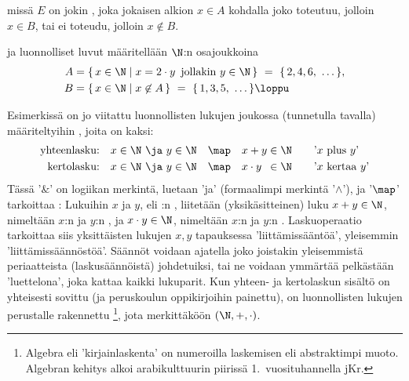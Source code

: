 missä $E$ on jokin , joka jokaisen alkion $x \in A$ kohdalla joko toteutuu, jolloin 
$x \in B$, tai ei toteudu, jolloin $x \not\in B$.
\begin{Exa}  ja  luonnolliset luvut määritellään $\N$:n osajoukkoina
\begin{align*}
A &= \{\,x \in \N \mid x=2\cdot y\,\ \text{jollakin}\ y\in\N\,\}\ =\ \{\,2,4,6,\ \ldots\,\}, \\
B &= \{\,x\in\N \mid x\not\in A\,\}\ =\ \{\,1,3,5,\ \ldots\,\} \loppu
\end{align*}
\end{Exa}
Esimerkissä on jo viitattu luonnollisten lukujen joukossa (tunnetulla tavalla) määriteltyihin 
, joita on kaksi:
\begin{align*}
\text{yhteenlasku:} \quad &x \in \N\ \ja\ y \in \N \quad \map \quad 
                             x + y \in \N \quad \quad \text{'$x$ plus $y$'} \\
\text{kertolasku:}  \quad &x \in \N\ \ja\ y \in \N \quad \map \quad 
                             x \cdot y\ \,\in \N \quad \quad \text{'$x$ kertaa $y$'}
\end{align*}
Tässä '$\&$' on logiikan merkintä, luetaan 'ja' (formaalimpi merkintä '$\wedge$'), ja 
'$\map$' tarkoittaa : Lukuihin $x$ ja $y$, eli \N:n , liitetään
(yksikäsitteinen) luku $x + y \in \N$, nimeltään $x$:n ja $y$:n , ja 
$x \cdot y \in \N$, nimeltään $x$:n ja $y$:n . Laskuoperaatio tarkoittaa siis 
yksittäisten lukujen $x,y$ tapauksessa 'liittämissääntöä', yleisemmin 'liittämissäännöstöä'. 
Säännöt voidaan ajatella joko joistakin yleisemmistä periaatteista (laskusäännöistä) 
johdetuiksi, tai ne voidaan ymmärtää pelkästään 'luettelona', joka kattaa kaikki lukuparit. Kun
yhteen- ja kertolaskun sisältö on yhteisesti sovittu (ja peruskoulun oppikirjoihin painettu), on
luonnollisten lukujen perustalle rakennettu \footnote[2]{Algebra eli 'kirjainlaskenta'
on numeroilla laskemisen eli  abstraktimpi muoto. Algebran kehitys alkoi
arabikulttuurin piirissä 1.\ vuosituhannella jKr.}, jota merkittäköön $(\N,+,\cdot)$.

